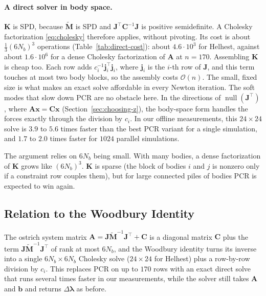 \paragraph{A direct solver in body space.}
$\mathbf{K}$ is SPD, because $\tilde{\mathbf{M}}$ is SPD and
$\mathbf{J}^\top\mathbf{C}^{-1}\mathbf{J}$ is positive semidefinite. A
Cholesky factorization \eqref{eq:cholesky} therefore applies, without
pivoting. Its cost is about $\tfrac{1}{3}(6N_b)^3$ operations
(Table~\ref{tab:direct-cost}): about $4.6 \cdot 10^3$ for Helhest, against
about $1.6 \cdot 10^6$ for a dense Cholesky factorization of $\mathbf{A}$
at $n = 170$. Assembling $\mathbf{K}$ is cheap too. Each row adds
$c_i^{-1}\mathbf{j}_i^\top\mathbf{j}_i$, where $\mathbf{j}_i$ is the $i$-th
row of $\mathbf{J}$, and this term touches at most two body blocks, so the
assembly costs $\mathcal{O}(n)$. The small, fixed size is what makes an
exact solve affordable in every Newton iteration. The soft modes that slow
down PCR are no obstacle here. In the directions of
$\operatorname{null}(\mathbf{J}^\top)$, where
$\mathbf{A}\mathbf{x} = \mathbf{C}\mathbf{x}$
(Section~\ref{sec:choosing-z}), the body-space form handles the forces
exactly through the division by $c_i$. In our offline measurements, this
$24 \times 24$ solve is $3.9$ to $5.6$ times faster than the best PCR
variant for a single simulation, and $1.7$ to $2.0$ times faster for $1024$
parallel simulations.

The argument relies on $6N_b$ being small. With many bodies, a dense
factorization of $\mathbf{K}$ grows like $(6N_b)^3$. $\mathbf{K}$ is sparse
(the block of bodies $i$ and $j$ is nonzero only if a constraint row couples
them), but for large connected piles of bodies PCR is expected to win again.

\subsection{Relation to the Woodbury Identity}
\label{sec:woodbury}

The ostrich system matrix
$\mathbf{A} = \mathbf{J}\tilde{\mathbf{M}}^{-1}\mathbf{J}^\top + \mathbf{C}$
is a diagonal matrix $\mathbf{C}$ plus the term
$\mathbf{J}\tilde{\mathbf{M}}^{-1}\mathbf{J}^\top$ of rank at most $6N_b$,
and the Woodbury identity turns its inverse into a single
$6N_b \times 6N_b$ Cholesky solve ($24 \times 24$ for Helhest) plus a
row-by-row division by $c_i$. This replaces PCR on up to $170$ rows with an
exact direct solve that runs several times faster in our measurements,
while the solver still takes $\mathbf{A}$ and $\mathbf{b}$ and returns
$\Delta\boldsymbol{\lambda}$ as before.

